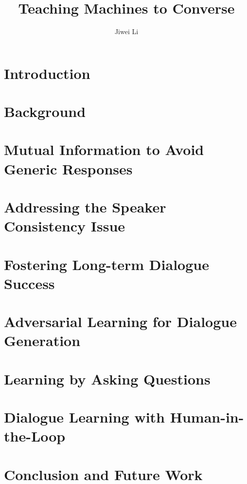 \documentclass[12pt]{report}
\begin{document}
\title{Teaching Machines to Converse}
\author{Jiwei Li}

\beforepreface


\afterpreface

\chapter{Introduction}
\label{intro}

\chapter{Background}
\label{back}

\chapter{Mutual Information to Avoid Generic Responses}
\label{mutual}

\chapter{Addressing the Speaker Consistency Issue}
\label{persona}


\chapter{Fostering Long-term Dialogue Success}
\label{RL}



\chapter{Adversarial Learning for Dialogue Generation}
\label{adversarial}



\chapter{Learning by  Asking Questions}
\label{AQ}


\chapter{Dialogue Learning with Human-in-the-Loop}
\label{HITL}


\chapter{Conclusion and Future Work}
\label{conclusion}





\end{document}
